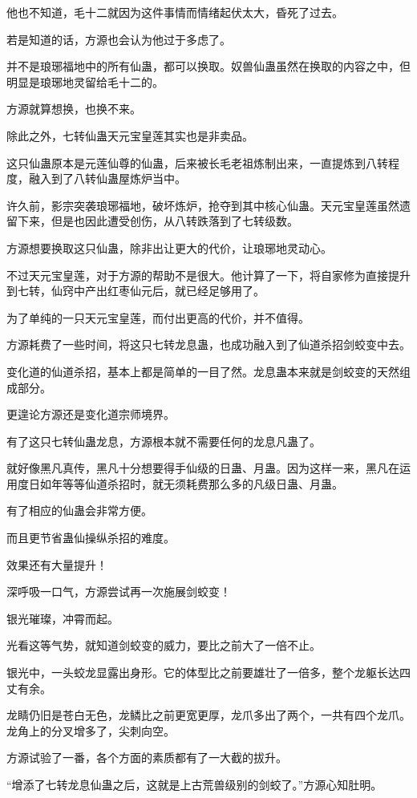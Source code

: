 \begin{this_body}
他也不知道，毛十二就因为这件事情而情绪起伏太大，昏死了过去。

若是知道的话，方源也会认为他过于多虑了。

并不是琅琊福地中的所有仙蛊，都可以换取。奴兽仙蛊虽然在换取的内容之中，但明显是琅琊地灵留给毛十二的。

方源就算想换，也换不来。

除此之外，七转仙蛊天元宝皇莲其实也是非卖品。

这只仙蛊原本是元莲仙尊的仙蛊，后来被长毛老祖炼制出来，一直提炼到八转程度，融入到了八转仙蛊屋炼炉当中。

许久前，影宗突袭琅琊福地，破坏炼炉，抢夺到其中核心仙蛊。天元宝皇莲虽然遗留下来，但是也因此遭受创伤，从八转跌落到了七转级数。

方源想要换取这只仙蛊，除非出让更大的代价，让琅琊地灵动心。

不过天元宝皇莲，对于方源的帮助不是很大。他计算了一下，将自家修为直接提升到七转，仙窍中产出红枣仙元后，就已经足够用了。

为了单纯的一只天元宝皇莲，而付出更高的代价，并不值得。

方源耗费了一些时间，将这只七转龙息蛊，也成功融入到了仙道杀招剑蛟变中去。

变化道的仙道杀招，基本上都是简单的一目了然。龙息蛊本来就是剑蛟变的天然组成部分。

更遑论方源还是变化道宗师境界。

有了这只七转仙蛊龙息，方源根本就不需要任何的龙息凡蛊了。

就好像黑凡真传，黑凡十分想要得手仙级的日蛊、月蛊。因为这样一来，黑凡在运用度日如年等等仙道杀招时，就无须耗费那么多的凡级日蛊、月蛊。

有了相应的仙蛊会非常方便。

而且更节省蛊仙操纵杀招的难度。

效果还有大量提升！

深呼吸一口气，方源尝试再一次施展剑蛟变！

银光璀璨，冲霄而起。

光看这等气势，就知道剑蛟变的威力，要比之前大了一倍不止。

银光中，一头蛟龙显露出身形。它的体型比之前要雄壮了一倍多，整个龙躯长达四丈有余。

龙睛仍旧是苍白无色，龙鳞比之前更宽更厚，龙爪多出了两个，一共有四个龙爪。龙角上的分叉增多了，尖刺向空。

方源试验了一番，各个方面的素质都有了一大截的拔升。

“增添了七转龙息仙蛊之后，这就是上古荒兽级别的剑蛟了。”方源心知肚明。


\end{this_body}
